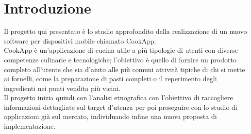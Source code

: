 \section*{Introduzione}
Il progetto qui presentato è lo studio approfondito della realizzazione di un nuovo software per dispositivi mobile chiamato CookApp.\\
CookApp è un'applicazione di cucina utile a più tipologie di utenti con diverse competenze culinarie e tecnologiche; l'obiettivo è quello di fornire un prodotto completo all'utente che sia d'aiuto alle più comuni attività tipiche di chi si mette ai fornelli, come la preparazione di pasti completi o il reperimento degli ingredienti nei punti vendita più vicini.\\
Il progetto inizia quindi con l'analisi etnografica con l'obiettivo di raccogliere informazioni dettagliate sul target d'utenza per poi proseguire con lo studio di applicazioni già sul mercato, individuando infine una nuova proposta di implementazione.\\